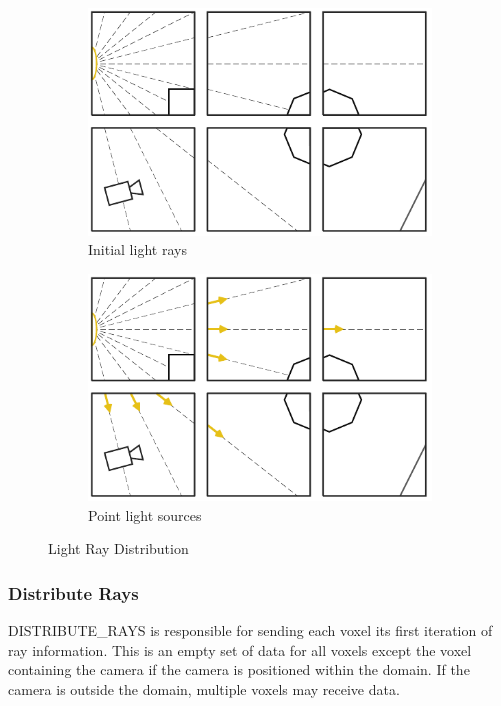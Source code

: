 \documentclass{vgtc}                          %
\begin{document}
\begin{figure}[!htb]
\centering
\begin{subfigure}{.49\columnwidth}
 \centering
  \includegraphics[width=.98\columnwidth]{drawings/Lights1.pdf}
  \caption{Initial light rays}
\end{subfigure}
\begin{subfigure}{.49\columnwidth}
 \centering
  \includegraphics[width=.98\columnwidth]{drawings/Lights2.pdf}
  \caption{Point light sources}
\end{subfigure}
\caption{Light Ray Distribution}
\label{fig:light}
\end{figure}

\subsubsection{Distribute Rays}

DISTRIBUTE\_RAYS is responsible for sending each voxel its first iteration of ray information.  This is an empty set of data for all voxels except the voxel containing the camera if the camera is positioned within the domain.  If the camera is outside the domain, multiple voxels may receive data.
\end{document}
